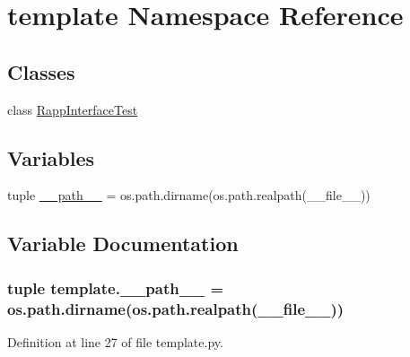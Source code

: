 \hypertarget{namespacetemplate}{\section{template Namespace Reference}
\label{namespacetemplate}
}
\subsection*{Classes}
\begin{DoxyCompactItemize}
\item 
class \hyperlink{classtemplate_1_1RappInterfaceTest}{Rapp\-Interface\-Test}
\end{DoxyCompactItemize}
\subsection*{Variables}
\begin{DoxyCompactItemize}
\item 
tuple \hyperlink{namespacetemplate_a8f9ddc45e9f42f9e8051f8158f6d6b7c}{\-\_\-\-\_\-path\-\_\-\-\_\-} = os.\-path.\-dirname(os.\-path.\-realpath(\-\_\-\-\_\-file\-\_\-\-\_\-))
\end{DoxyCompactItemize}


\subsection{Variable Documentation}
\hypertarget{namespacetemplate_a8f9ddc45e9f42f9e8051f8158f6d6b7c}{
\subsubsection[{\-\_\-\-\_\-path\-\_\-\-\_\-}]{\setlength{\rightskip}{0pt plus 5cm}tuple template.\-\_\-\-\_\-path\-\_\-\-\_\- = os.\-path.\-dirname(os.\-path.\-realpath(\-\_\-\-\_\-file\-\_\-\-\_\-))}}\label{namespacetemplate_a8f9ddc45e9f42f9e8051f8158f6d6b7c}


Definition at line 27 of file template.\-py.

